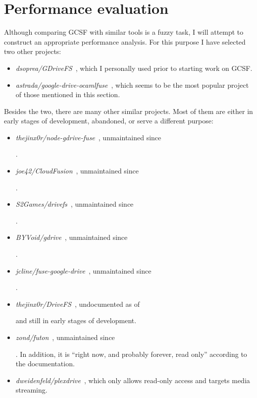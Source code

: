 \chapter{Performance evaluation}

Although comparing GCSF with similar tools is a fuzzy task, I will attempt to construct an appropriate performance analysis. For this purpose I have selected two other projects:

\begin{itemize}
  \itemsep0em
  \item \emph{dsoprea/GDriveFS}~\cite{dsoprea/GDriveFS}, which I personally used prior to starting work on GCSF.
  \item \emph{astrada/google-drive-ocamlfuse}~\cite{astrada/google-drive-ocamlfuse}, which seems to be the most popular project of those mentioned in this section.
\end{itemize}

Besides the two, there are many other similar projects. Most of them are either in early stages of development, abandoned, or serve a different purpose:

\begin{itemize}
  \itemsep0em
  \item \emph{thejinx0r/node-gdrive-fuse}~\cite{thejinx0r/node-gdrive-fuse}, unmaintained since \date{February 2016}.
  \item \emph{joe42/CloudFusion}~\cite{joe42/CloudFusion}, unmaintained since \date{January 2015}.
  \item \emph{S2Games/drivefs}~\cite{S2Games/drivefs}, unmaintained since \date{June 2014}.
  \item \emph{BYVoid/gdrive}~\cite{BYVoid/gdrive}, unmaintained since \date{October 2013}.
  \item \emph{jcline/fuse-google-drive}~\cite{jcline/fuse-google-drive}, unmaintained since \date{September 2012}.
  \item \emph{thejinx0r/DriveFS}~\cite{thejinx0r/DriveFS}, undocumented as of \date{June 2018} and still in early stages of development.
  \item \emph{zond/futon}~\cite{zond/futon}, unmaintained since \date{December 2014}. In addition, it is ``right now, and probably forever, read only'' according to the documentation.
  \item \emph{dweidenfeld/plexdrive}~\cite{dweidenfeld/plexdrive}, which only allows read-only access and targets media streaming.
\end{itemize}

